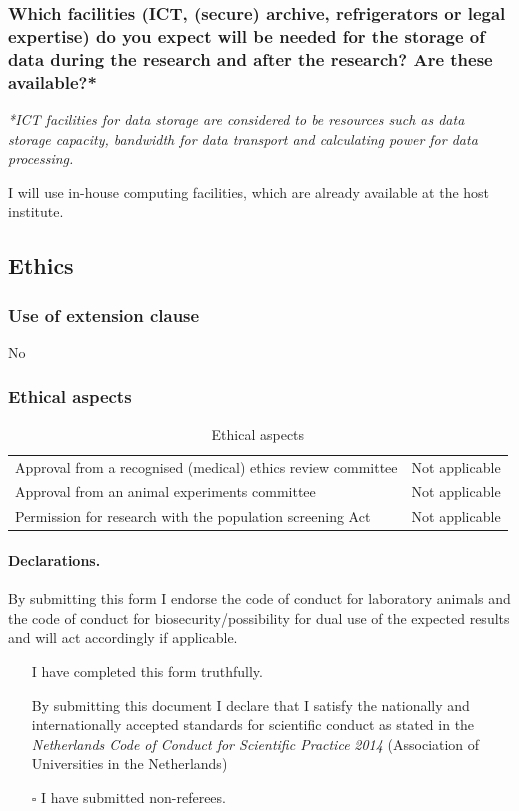 \documentclass[serif, twocolumn, numeric, rga]{jote-article}
\begin{document}
\subsubsection*{Which facilities (ICT, (secure) archive, refrigerators or legal expertise) do you expect will be needed for the storage of data during the research and after the research? Are these available?*}

\emph{*ICT facilities for data storage are considered to be resources such as data storage capacity, bandwidth for data transport and calculating power for data processing.}

I will use in-house computing facilities, which are already available at the host institute.

\subsection*{Ethics}

\subsubsection*{Use of extension clause}

No 
\subsubsection*{Ethical aspects}


\begin{table}[h!]\sffamily\mdseries\begin{tabularx}{\columnwidth}{Xl}\toprule 
Approval from a recognised (medical) ethics review committee & Not applicable \tabularnewline Approval from an animal experiments committee & Not applicable\tabularnewline Permission for research with the population screening Act & Not applicable \tabularnewline \bottomrule
\end{tabularx}
\caption{Ethical aspects}
\vspace{-\baselineskip}
\end{table}



\paragraph{Declarations.}

By submitting this form I endorse the code of conduct for laboratory animals and the code of conduct for biosecurity/possibility for dual use of the expected results and will act accordingly if applicable.
\begin{itemize}
\item[\checkedbox] I have completed this form truthfully.

\item[\checkedbox] By submitting this document I declare that I satisfy the nationally and internationally accepted standards for scientific conduct as stated in the \emph{Netherlands Code of Conduct for Scientific Practice} \emph{2014} (Association of Universities in the Netherlands) 
\item[$\square$] I have submitted non-referees. 
\end{itemize}
\end{document}
